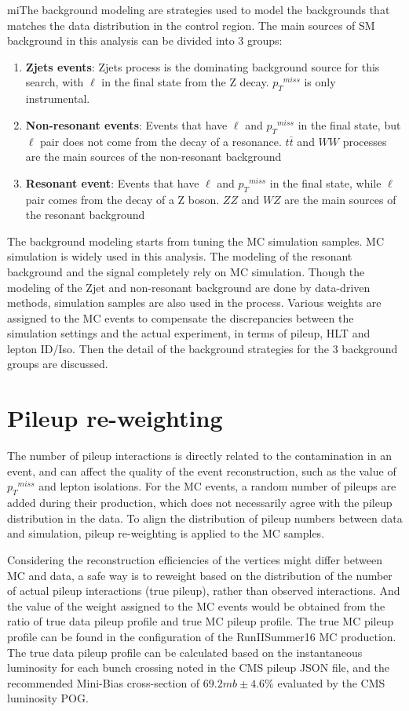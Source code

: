 miThe background modeling are strategies used to model the backgrounds that matches the data distribution in the control region. The main sources of SM background in this analysis can be divided into 3 groups:
\begin{enumerate}
\item \textbf{Zjets events}: Zjets process is the dominating background source for this search, with $\ell$ in the final state from the Z decay. ${p_{T}}^{miss}$ is only instrumental.
\item \textbf{Non-resonant events}: Events that have $\ell$ and ${p_{T}}^{miss}$ in the final state, but $\ell$ pair does not come from the decay of a resonance. $t\bar{t}$ and $WW$ processes are the main sources of the non-resonant background
\item \textbf{Resonant event}: Events that have $\ell$ and ${p_{T}}^{miss}$ in the final state, while $\ell$ pair comes from the decay of a Z boson. $ZZ$ and $WZ$ are the main sources of the resonant background
\end{enumerate}

\vspace{0.3cm}
The background modeling starts from tuning the MC simulation samples. MC simulation is widely used in this analysis. The modeling of the resonant background and the signal completely rely on MC simulation. Though the modeling of the Zjet and non-resonant background are done by data-driven methods, simulation samples are also used in the process. Various weights are assigned to the MC events to compensate the discrepancies between the simulation settings and the actual experiment, in terms of pileup, HLT and lepton ID/Iso. Then the detail of the background strategies for the 3 background groups are discussed.

\section{Pileup re-weighting}
The number of pileup interactions is directly related to the contamination in an event, and can affect the quality of the event reconstruction, such as the value of ${p_{T}}^{miss}$ and lepton isolations. For the MC events, a random number of pileups are added during their production, which does not necessarily agree with the pileup distribution in the data. To align the distribution of pileup numbers between data and simulation, pileup re-weighting is applied to the MC samples. 

\vspace{0.3cm}
Considering the reconstruction efficiencies of the vertices might differ between MC and data, a safe way is to reweight based on the distribution of the number of actual pileup interactions (true pileup), rather than observed interactions. And the value of the weight assigned to the MC events would be obtained from the ratio of true data pileup profile and true MC pileup profile. The true MC pileup profile can be found in the configuration of the RunIISummer16 MC production. The true data pileup profile can be calculated based on the instantaneous luminosity for each bunch crossing noted in the CMS pileup JSON file, and the recommended Mini-Bias cross-section of $69.2 mb \pm 4.6\%$ evaluated by the CMS luminosity POG.

